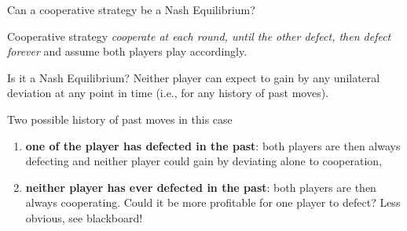 \begin{frame}{Can a cooperative strategy be a Nash Equilibrium?}
    \begin{block}{Cooperative strategy}
        \textit{cooperate at each round, until the other defect,
        then defect forever} and assume both players play accordingly.
    \end{block}

    \begin{exampleblock}{Is it a Nash Equilibrium?}
        Neither player can expect to gain by any unilateral deviation at any point
        in time (i.e., for any history of past moves).
        
        Two possible history of past moves in this case
        \begin{enumerate}
            \pause
            \item \textbf{one of the player has defected in the past}: both players are then always defecting
            and neither player could gain by deviating alone to cooperation, \pause
            \item \textbf{neither player has ever defected in the past}: both players are then always
            cooperating.
            Could it be more profitable for one player to defect? Less obvious, see blackboard!
        \end{enumerate}
    \end{exampleblock}
\end{frame}
    



